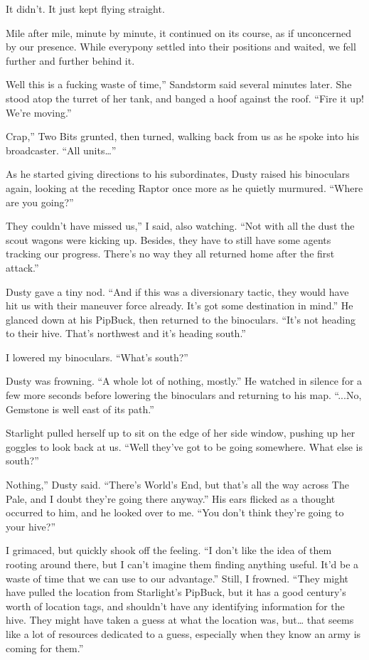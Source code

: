 It didn’t. It just kept flying straight.

Mile after mile, minute by minute, it continued on its course, as if unconcerned by our presence. While everypony settled into their positions and waited, we fell further and further behind it.

\leavevmode{}Well this is a fucking waste of time,” Sandstorm said several minutes later. She stood atop the turret of her tank, and banged a hoof against the roof. “Fire it up! We’re moving.”

\leavevmode{}Crap,” Two Bits grunted, then turned, walking back from us as he spoke into his broadcaster. “All units…”

As he started giving directions to his subordinates, Dusty raised his binoculars again, looking at the receding Raptor once more as he quietly murmured. “Where are you going?”

\leavevmode{}They couldn’t have missed us,” I said, also watching. “Not with all the dust the scout wagons were kicking up. Besides, they have to still have some agents tracking our progress. There’s no way they all returned home after the first attack.”

Dusty gave a tiny nod. “And if this was a diversionary tactic, they would have hit us with their maneuver force already. It’s got some destination in mind.” He glanced down at his PipBuck, then returned to the binoculars. “It’s not heading to their hive. That’s northwest and it’s heading south.”

I lowered my binoculars. “What’s south?”

Dusty was frowning. “A whole lot of nothing, mostly.” He watched in silence for a few more seconds before lowering the binoculars and returning to his map. “...No, Gemstone is well east of its path.”

Starlight pulled herself up to sit on the edge of her side window, pushing up her goggles to look back at us. “Well they’ve got to be going somewhere. What else is south?”

\leavevmode{}Nothing,” Dusty said. “There’s World’s End, but that’s all the way across The Pale, and I doubt they’re going there anyway.” His ears flicked as a thought occurred to him, and he looked over to me. “You don’t think they’re going to your hive?”

I grimaced, but quickly shook off the feeling. “I don’t like the idea of them rooting around there, but I can’t imagine them finding anything useful. It’d be a waste of time that we can use to our advantage.” Still, I frowned. “They might have pulled the location from Starlight’s PipBuck, but it has a good century’s worth of location tags, and shouldn’t have any identifying information for the hive. They might have taken a guess at what the location was, but… that seems like a lot of resources dedicated to a guess, especially when they know an army is coming for them.”

